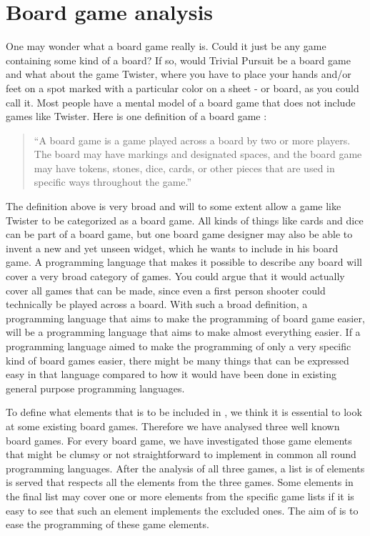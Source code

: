 \section{Board game analysis}
\label{sec:board-game-analysis}

One may wonder what a board game really is. Could it just be any game
containing some kind of a board? If so, would Trivial Pursuit be a board
game and what about the game Twister, where you have to place your hands
and/or feet on a spot marked with a particular color on a sheet - or
board, as you could call it. Most people have a mental model of a board
game that does not include games like Twister. Here is one definition of
a board game \cite{def-board-game}:

\begin{quote}
  ``A board game is a game played across a board by two or
  more players. The board may have markings and designated spaces, and the
  board game may have tokens, stones, dice, cards, or other pieces that
  are used in specific ways throughout the game.''
\end{quote}

The definition above is very broad and will to some extent allow a game
like Twister to be categorized as a board game. All kinds of things
like cards and dice can be part of a board game, but one board game
designer may also be able to invent a new and yet unseen widget, which
he wants to include in his board game. A programming language that makes
it possible to describe any board will cover a very broad category of
games. You could argue that it would actually cover all games that can
be made, since even a first person shooter could technically be played across a
board. With such a broad definition, a programming language that aims
to make the programming of board game easier, will be a programming
language that aims to make almost everything easier. If a programming
language aimed to make the programming of only a very specific kind of
board games easier, there might be many things that can be expressed easy in that language compared 
to how it would have been done in existing general purpose programming languages.

To define what elements that is to be included in \productname{}, we think it is essential to look at some existing board games. Therefore we have analysed three well known board games. For every board game, we have investigated those game elements that
might be clumsy or not straightforward to implement in common all round programming languages. After the analysis of all three games, a list is of elements is served that respects all the elements from the three games. Some elements in the final list may cover one or more elements from the specific game lists if it is easy to see that such an element implements the excluded ones. The aim of \productname{} is to ease the programming of these game elements.

